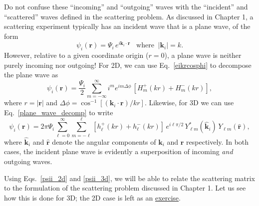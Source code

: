 \documentclass[pra,12pt]{revtex4}
\begin{document}
Do not confuse these ``incoming'' and ``outgoing'' waves with the
``incident'' and ``scattered'' waves defined in the scattering
problem.  As discussed in Chapter 1, a scattering experiment typically
has an incident wave that is a plane wave, of the form
\begin{equation}
  \psi_i(\mathbf{r}) = \Psi_i \, e^{i\mathbf{k}_i\cdot\mathbf{r}} \;\;\;
  \mathrm{where}\;\; |\mathbf{k}_i| = k.
\end{equation}
However, relative to a given coordinate origin ($r = 0$), a plane wave
is neither purely incoming nor outgoing!  For 2D, we can use
Eq.~\eqref{eikrcosphi} to decompose the plane wave as
\begin{equation}
  \psi_i(\mathbf{r})
  = \frac{\Psi_i}{2} \sum_{m=-\infty}^\infty i^m e^{im \Delta\phi} \,
  \left[H_m^+(kr) + H_m^-(kr)\right],
  \label{psii_2d}
\end{equation}
where $r = |\mathbf{r}|$ and $\Delta \phi =
\cos^{-1}\left[(\mathbf{k}_i\!\cdot\!\mathbf{r})/kr\right]$.
Likewise, for 3D we can use Eq.~\eqref{plane_wave_decomp} to write
\begin{equation}
  \psi_i(\mathbf{r})
  = 2\pi \Psi_i \sum_{\ell=0}^\infty \sum_{m=-\ell}^\ell
  \left[h_{\ell}^+(kr) + h_{\ell}^-(kr) \right] \, e^{i\ell\pi/2} \,
  Y_{\ell m}^*(\hat{\mathbf{k}}_i) \, Y_{\ell m}(\hat{\mathbf{r}}),
  \label{psii_3d}
\end{equation}
where $\hat{\mathbf{k}}_i$ and $\hat{\mathbf{r}}$ denote the angular
components of $\mathbf{k}_i$ and $\mathbf{r}$ respectively.  In both
cases, the incident plane wave is evidently a superposition of
incoming \textit{and} outgoing waves.

Using Eqs.~\eqref{psii_2d} and \eqref{psii_3d}, we will be able to
relate the scattering matrix to the formulation of the scattering
problem discussed in Chapter 1.  Let us see how this is done for 3D;
the 2D case is left as an \hyperref[ex:2dscattering]{exercise}.
\end{document}
